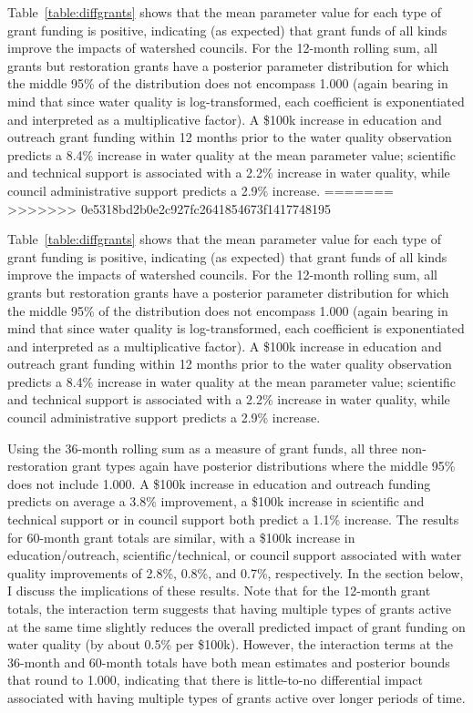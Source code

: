 \documentclass[12pt,a4paper,titlepage]{article}
\begin{document}
Table~\ref{table:diffgrants} shows that the mean parameter value for each type of grant funding is positive, indicating (as expected) that grant funds of all kinds improve the impacts of watershed councils. For the 12-month rolling sum, all grants but restoration grants have a posterior parameter distribution for which the middle 95\% of the distribution does not encompass 1.000 (again bearing in mind that since water quality is log-transformed, each coefficient is exponentiated and interpreted as a multiplicative factor). A \$100k increase in education and outreach grant funding within 12 months prior to the water quality observation predicts a 8.4\% increase in water quality at the mean parameter value; scientific and technical support is associated with a 2.2\% increase in water quality, while council administrative support predicts a 2.9\% increase.
=======
>>>>>>> 0e5318bd2b0e2c927fc2641854673f1417748195

Table~\ref{table:diffgrants} shows that the mean parameter value for each type of grant funding is positive, indicating (as expected) that grant funds of all kinds improve the impacts of watershed councils. For the 12-month rolling sum, all grants but restoration grants have a posterior parameter distribution for which the middle 95\% of the distribution does not encompass 1.000 (again bearing in mind that since water quality is log-transformed, each coefficient is exponentiated and interpreted as a multiplicative factor). A \$100k increase in education and outreach grant funding within 12 months prior to the water quality observation predicts a 8.4\% increase in water quality at the mean parameter value; scientific and technical support is associated with a 2.2\% increase in water quality, while council administrative support predicts a 2.9\% increase.



Using the 36-month rolling sum as a measure of grant funds, all three non-restoration grant types again have posterior distributions where the middle 95\% does not include 1.000. A \$100k increase in education and outreach funding predicts on average a 3.8\% improvement, a \$100k increase in scientific and technical support or in council support both predict a 1.1\% increase. The results for 60-month grant totals are similar, with a \$100k increase in education/outreach, scientific/technical, or council support associated with water quality improvements of 2.8\%, 0.8\%, and 0.7\%, respectively. In the section below, I discuss the implications of these results. Note that for the 12-month grant totals, the interaction term suggests that having multiple types of grants active at the same time slightly reduces the overall predicted impact of grant funding on water quality (by about 0.5\% per \$100k). However, the interaction terms at the 36-month and 60-month totals have both mean estimates and posterior bounds that round to 1.000, indicating that there is little-to-no differential impact associated with having multiple types of grants active over longer periods of time.
\end{document}
